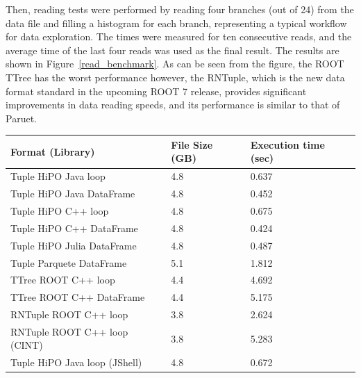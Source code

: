 Then, reading tests were performed by reading four branches (out of 24) from the data file and filling a histogram for each branch, representing a typical workflow for data exploration. The times were measured for ten consecutive reads, and the average time of the last four reads was used as the final result. The results are shown in Figure~\ref{read_benchmark}. As can be seen from the figure, the ROOT TTree has the worst performance however, the RNTuple, which is the new data format standard in the upcoming ROOT 7 release, provides significant improvements in data reading speeds, and its performance is similar to that of Paruet. 


\begin{table}[h!]
\centering
\begin{tabular}{|p{7cm}|p{3.0cm}|p{4.0cm}|}
\hline
\textbf{Format (Library)} & File Size (GB)  &  Execution time (sec)  \\ \hline \hline
Tuple HiPO Java loop      & 4.8&0.637 \\ \hline
Tuple HiPO Java DataFrame &4.8& 0.452 \\ \hline
Tuple HiPO C++  loop      &4.8& 0.675 \\ \hline
Tuple HiPO C++  DataFrame &4.8& 0.424 \\ \hline
Tuple HiPO Julia  DataFrame &4.8& 0.487 \\ \hline
Tuple Parquete DataFrame  &5.1& 1.812 \\ \hline
TTree ROOT C++ loop       &4.4 & 4.692 \\ \hline
TTree ROOT C++ DataFrame  &4.4 & 5.175 \\ \hline
RNTuple ROOT C++ loop     &3.8& 2.624 \\ \hline
RNTuple ROOT C++ loop (CINT)    &3.8&  5.283 \\ \hline
Tuple HiPO Java loop (JShell)  &4.8&  0.672 \\ \hline

\end{tabular}
\end{table}
